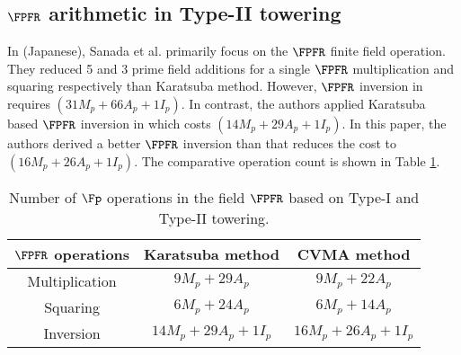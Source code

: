\subsection{$\FPFR$ arithmetic in Type-II towering}
In \cite{cvma_sanada} (Japanese), Sanada et al. primarily focus on the $\FPFR$ finite field operation.
They reduced 5 and 3 prime field additions for a single $\FPFR$ multiplication and squaring respectively than Karatsuba method.
However, $\FPFR$ inversion in \cite{cvma_sanada} requires $(31 M_p +66A_p+1I_p)$.
In contrast, the authors applied Karatsuba based $\FPFR$ inversion in \cite{self_indo17} which costs $(14 M_p +29A_p+1I_p)$.
In this paper, the authors derived a better $\FPFR$ inversion than \cite{cvma_sanada} that reduces the cost to $(16M_p+26A_p+1I_p)$. 
The comparative operation count is shown in Table \ref{tab_fp4_operation}.
\renewcommand{\baselinestretch}{1.5}
\begin{table*}[!h]
	\centering
	\begin{tabular}{|c|c|c|}
		\hline
		$\FPFR  $ operations & Karatsuba method               & CVMA  method \\
		\hline
		Multiplication    & $9M_p + 29A_p$     & $9M_p+22A_p$       \\ \hline
		Squaring          & $6M_p+24A_p$       & $6M_p+14A_p$       \\ \hline
		Inversion         & $14M_p+29A_p+1I_p$ & $16M_p+26A_p+1I_p$ \\ \hline
	\end{tabular}
	\caption{Number of $\Fp$ operations in the field $\FPFR$ based on Type-I and Type-II towering.}
	\label{tab_fp4_operation}
\end{table*}
\renewcommand{\baselinestretch}{1.0}
